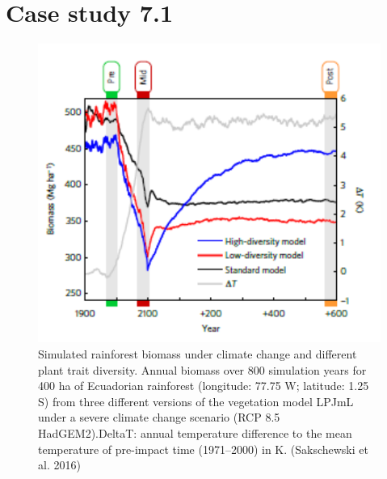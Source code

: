 \documentclass[
  12pt,
  oneside]{book}
\begin{document}
\hypertarget{case-study-7.1}{%
\section{Case study 7.1}\label{case-study-7.1}}

\begin{figure}

{\centering \includegraphics[width=0.8\linewidth]{figures/chap7/f720_lpjML_1} 

}

\caption{Simulated rainforest biomass under climate change and different plant trait diversity. Annual biomass over 800 simulation years for 400 ha of Ecuadorian rainforest (longitude: 77.75 W; latitude: 1.25 S) from three different versions of the vegetation model LPJmL under a severe climate change scenario (RCP 8.5 HadGEM2).DeltaT: annual temperature difference to the mean temperature of pre-impact time (1971–2000) in K. (Sakschewski et al. 2016)}\label{fig:f720}
\end{figure}
\end{document}

